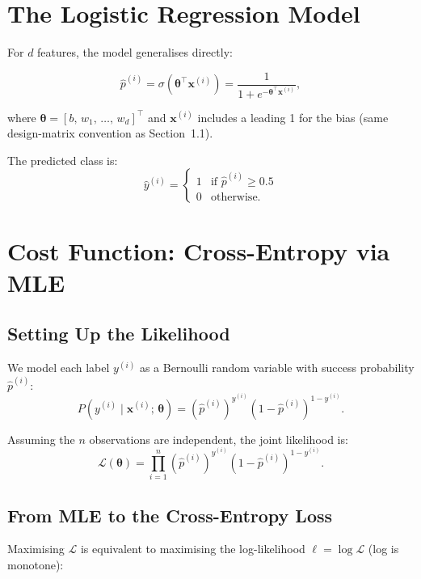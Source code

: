 \documentclass[12pt, a4paper]{article}
\theoremstyle{definition}
\newcommand{\bth}{\boldsymbol{\theta}}
\newcommand{\bx}{\mathbf{x}}
\newcommand{\sigmoid}{\sigma}
\begin{document}
\section{The Logistic Regression Model}

For $d$ features, the model generalises directly:

\begin{equation}
  \hat{p}^{(i)} = \sigmoid\!\left(\bth^{\top}\bx^{(i)}\right)
  = \frac{1}{1 + e^{-\bth^{\top}\bx^{(i)}}},
  \label{eq:logreg}
\end{equation}

where $\bth = [b,\, w_1,\, \ldots,\, w_d]^{\top}$ and $\bx^{(i)}$ includes a
leading 1 for the bias (same design-matrix convention as Section~1.1).

The predicted class is:
\[
  \hat{y}^{(i)} =
  \begin{cases} 1 & \text{if } \hat{p}^{(i)} \ge 0.5 \\ 0 & \text{otherwise.} \end{cases}
\]

\section{Cost Function: Cross-Entropy via MLE}

\subsection{Setting Up the Likelihood}

We model each label $y^{(i)}$ as a Bernoulli random variable with success
probability $\hat{p}^{(i)}$:
\[
  P\!\left(y^{(i)} \mid \bx^{(i)};\,\bth\right)
  = \left(\hat{p}^{(i)}\right)^{y^{(i)}}
  \left(1 - \hat{p}^{(i)}\right)^{1 - y^{(i)}}.
\]

Assuming the $n$ observations are independent, the joint likelihood is:
\[
  \mathcal{L}(\bth)
  = \prod_{i=1}^{n}
  \left(\hat{p}^{(i)}\right)^{y^{(i)}}
  \left(1 - \hat{p}^{(i)}\right)^{1 - y^{(i)}}.
\]

\subsection{From MLE to the Cross-Entropy Loss}

Maximising $\mathcal{L}$ is equivalent to maximising the log-likelihood
$\ell = \log \mathcal{L}$ (log is monotone):
\end{document}
